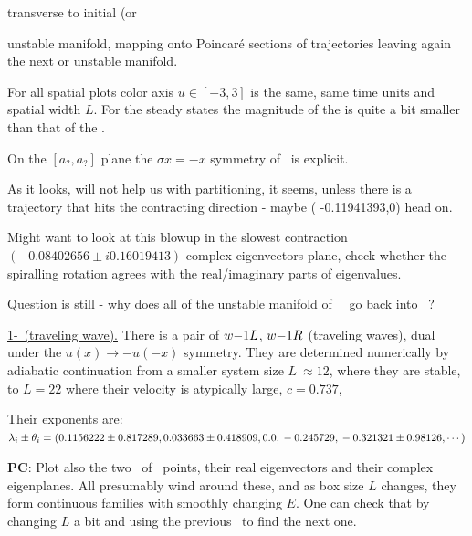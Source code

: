 transverse to initial  (or { unstable manifold, mapping onto
Poincar\'e sections of trajectories leaving again
the next  or  unstable manifold.

%

For all spatial plots color axis $u \in [-3, 3]$ is the same,
same time units and spatial width $L$.
For the steady states the magnitude of the  is quite
a bit smaller than that of the .

On the
    $[a_?,a_?]$ plane
    the $\sigma x = -x$ symmetry of \KSe\ is explicit.


As it looks, will not help us with partitioning, it seems, unless there is
a trajectory that hits the contracting direction - maybe
( -0.11941393,0)
head on.

Might want to look at this blowup in
the  slowest contraction
$   ( -0.08402656 \pm i 0.16019413)$
complex eigenvectors plane, check whether the
spiralling rotation agrees with the real/imaginary parts of eigenvalues.

Question is still - why does all of the unstable manifold of
~\eqv\ go back
into
~\eqv?


\underline{1-\reqv\  (traveling wave).}
There is a pair of {\reqva}
${w-}1L$,
${w-}1R$
(traveling waves), dual under the
$u(x) \to -u(-x)$ symmetry. They are
determined numerically by
adiabatic continuation from a smaller system size
$L~\approx 12$,
where they are stable, to $L=22$
where their velocity is atypically large, $c=0.737$,

Their exponents are:
\\
$\lambda_i \pm \theta_i =
(
\\
  0.1156222 \pm 0.817289,   \\
  0.033663 \pm 0.418909,    \\
 0.0                    ,   \\
 -0.245729                    , \\
 -0.321321 \pm 0.98126,
\cdots
)$

{\bf PC}:
Plot also the two \eqva\ of \eqva\ points, their
real eigenvectors and their complex eigenplanes. All {\eqva} presumably
wind around these, and as box size $L$ changes, they form continuous
families with smoothly changing $E$. One can check that by
changing $L$ a bit and using the previous \eqv\ to find the next
one.

}
